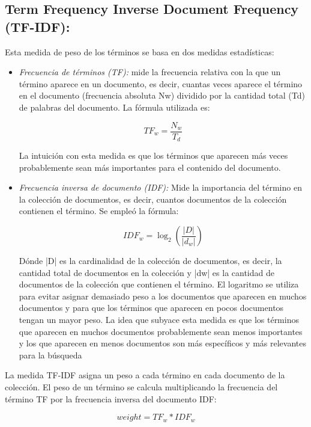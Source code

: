 \documentclass[a4paper,12pt,twocolumn]{article}
\begin{document}
\subsection{Term Frequency Inverse Document Frequency (TF-IDF):}
Esta medida de peso de los términos se basa en dos medidas estadísticas:
\begin{itemize}
    \item \emph{Frecuencia de términos (TF):} mide la frecuencia relativa con la que un término aparece
    en un documento, es decir, cuantas veces aparece el término en el documento
    (frecuencia absoluta Nw) dividido por la cantidad total (Td) de palabras del documento. La
    fórmula utilizada es:
    
    \begin{center}    
    \begin{equation}
        TF_w = \frac{N_w}{T_d}
    \end{equation}
    \end{center}
    La intuición con esta medida es que los términos que aparecen más veces
    probablemente sean más importantes para el contenido del documento.

    \item \emph{Frecuencia inversa de documento (IDF):} Mide la importancia del término en la colección
    de documentos, es decir, cuantos documentos de la colección contienen el término.
    Se empleó la fórmula:
        \begin{center}
        \begin{equation}
         IDF_w = \log_2(\frac{|D|}{|d_w|})   
        \end{equation}
        \end{center}

    Dónde |D| es la cardinalidad de la colección de documentos, es decir, la cantidad total
    de documentos en la colección y |dw| es la cantidad de documentos de la colección que
    contienen el término. El logaritmo se utiliza para evitar asignar demasiado peso 
    a los documentos que aparecen en muchos documentos y para que los términos que aparecen
    en pocos documentos tengan un mayor peso.
    La idea que subyace esta medida es que los términos que aparecen en muchos
    documentos probablemente sean menos importantes y los que aparecen en menos
    documentos son más específicos y más relevantes para la búsqueda
\end{itemize}

La medida TF-IDF asigna un peso a cada término en cada documento de la colección. El peso
de un término se calcula multiplicando la frecuencia del término TF por la frecuencia inversa del
documento IDF:
    \begin{center}
    \begin{equation}
        weight = TF_w * IDF_w 
    \end{equation}
    \end{center}
\end{document}
